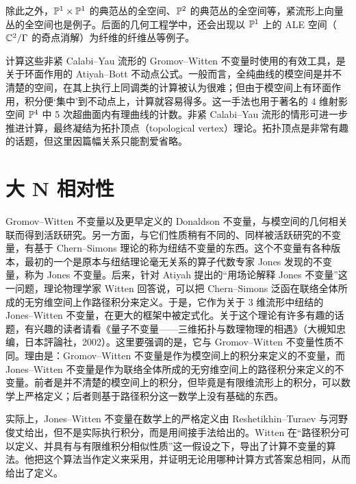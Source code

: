 
除此之外，$\mathbb{P}^{1}\times\mathbb{P}^{1}$ 的典范丛的全空间、$\mathbb{P}^{2}$ 的典范丛的全空间等，紧流形上向量丛的全空间也是例子。后面的几何工程学中，还会出现以 $\mathbb{P}^{1}$ 上的 ALE 空间（$\mathbb{C}^{2}/\Gamma$ 的奇点消解）为纤维的纤维丛等例子。

计算这些非紧 Calabi--Yau 流形的 Gromov--Witten 不变量时使用的有效工具，是关于环面作用的 Atiyah--Bott 不动点公式。一般而言，全纯曲线的模空间是并不清楚的空间，在其上执行上同调类的计算被认为很难；但由于模空间上有环面作用，积分便‘集中’到不动点上，计算就容易得多。这一手法也用于著名的 4 维射影空间 $\mathbb{P}^{4}$ 中 5 次超曲面内有理曲线的计数。非紧 Calabi--Yau 流形的情形可进一步推进计算，最终凝结为拓扑顶点（topological vertex）理论。拓扑顶点是非常有趣的话题，但这里因篇幅关系只能割爱省略。

\section{大 N 相对性}

Gromov--Witten 不变量以及更早定义的 Donaldson 不变量，与模空间的几何相关联而得到活跃研究。另一方面，与它们性质稍有不同的、同样被活跃研究的不变量，有基于 Chern--Simons 理论的称为纽结不变量的东西。这个不变量有各种版本，最初的一个是原本与纽结理论毫无关系的算子代数专家
Jones 发现的不变量，称为 Jones 不变量。后来，针对 Atiyah 提出的“用场论解释 Jones 不变量”这一问题，理论物理学家 Witten 回答说，可以把 Chern--Simons 泛函在联络全体所成的无穷维空间上作路径积分来定义。于是，它作为关于 3 维流形中纽结的 Jones--Witten 不变量，在更大的框架中被定式化。关于这个理论有许多有趣的话题，有兴趣的读者请看《量子不变量——三维拓扑与数理物理的相遇》（大槻知忠 编，日本評論社，2002）。这里要强调的是，它与 Gromov--Witten 不变量性质不同。理由是：Gromov--Witten 不变量是作为模空间上的积分来定义的不变量，而 Jones--Witten 不变量是作为联络全体所成的无穷维空间上的路径积分来定义的不变量。前者是并不清楚的模空间上的积分，但毕竟是有限维流形上的积分，可以数学上严格定义；后者则基于路径积分这一数学上没有基础的东西。

实际上，Jones--Witten 不变量在数学上的严格定义由 Reshetikhin--Turaev 与河野俊丈给出，但不是实际执行积分，而是用间接手法给出的。Witten 在“路径积分可以定义、并具有与有限维积分相似性质”这一假设之下，导出了计算不变量的算法。他把这个算法当作定义来采用，并证明无论用哪种计算方式答案总相同，从而给出了定义。

